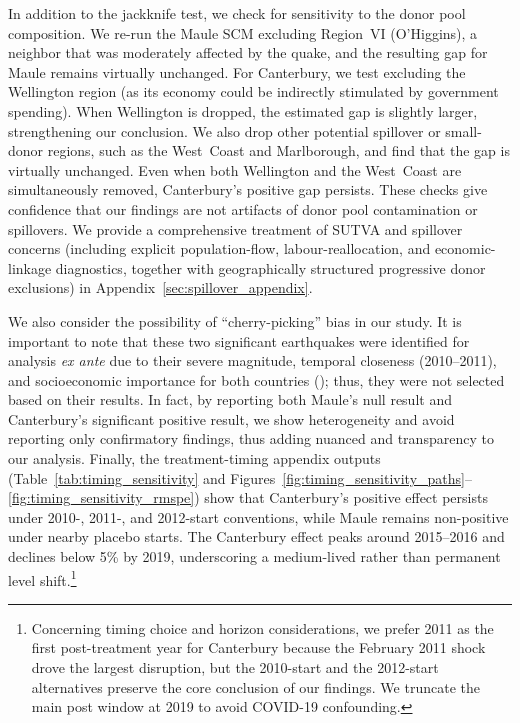\documentclass[12pt]{article}
\begin{document}
\iffalse
In addition to the jackknife test, we check for sensitivity to the donor pool composition.  We re-run the Maule SCM excluding Region VI (O’Higgins), a neighbor that was moderately affected by the quake, and the resulting gap for Maule remains virtually unchanged.  For Canterbury, we test excluding the Wellington region (as its economy could be indirectly stimulated by government spending).  When Wellington is dropped, the estimated gap is slightly larger, strengthening our conclusion. We also drop other potential spillover or small-donor regions, such as the West Coast and Marlborough, and find that the gap is virtually unchanged.  Even when both Wellington and the West Coast are simultaneously removed, Canterbury’s positive gap persists.  These checks give confidence that our findings are not artifacts of donor pool contamination or spillovers. We provide a comprehensive treatment of SUTVA and spillover concerns (including explicit population-flow, labour-reallocation, and economic-linkage diagnostics, together with geographically structured progressive donor exclusions) in Appendix~\ref{sec:spillover_appendix}.

We also consider the possibility of “cherry-picking” bias \autocite{ferman2020cherry} in our study. It is important to note that these two significant earthquakes were identified for analysis \textit{ ex ante} due to their severe magnitude, temporal closeness (2010–2011), and socioeconomic importance for both countries (\cite{dussaillant2014trust, cardenasjiron2012chilean, eqc2017annual, miller2013estimating}); thus, they were not selected based on their results. In fact, by reporting both Maule’s null result and Canterbury's significant positive result, we show heterogeneity and avoid reporting only confirmatory findings, thus adding nuanced and transparency to our analysis. Finally, the treatment-timing appendix outputs (Table~\ref{tab:timing_sensitivity} and Figures~\ref{fig:timing_sensitivity_paths}--\ref{fig:timing_sensitivity_rmspe}) show that Canterbury’s positive effect persists under 2010-, 2011-, and 2012-start conventions, while Maule remains non-positive under nearby placebo starts. The Canterbury effect peaks around 2015--2016 and declines below 5\% by 2019, underscoring a medium-lived rather than permanent level shift.\footnote{Concerning timing choice and horizon considerations, we prefer 2011 as the first post-treatment year for Canterbury because the February 2011 shock drove the largest disruption, but the 2010-start and the 2012-start alternatives preserve the core conclusion of our findings. We truncate the main post window at 2019 to avoid COVID-19 confounding.}
\end{document}

